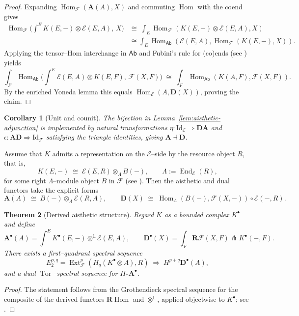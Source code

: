 \documentclass[12pt]{article}
\DeclareMathOperator{\Tor}{Tor}
\newcommand{\E}{\mathcal{E}}
\newcommand{\F}{\mathcal{F}}
\newcommand{\Ab}{\mathsf{Ab}}
\newcommand{\Hom}{\operatorname{Hom}}
\newcommand{\End}{\operatorname{End}}
\newcommand{\Ext}{\operatorname{Ext}}
\newcommand{\RHom}{\mathbf{R}\!\operatorname{Hom}}
\theoremstyle{plain}
\newtheorem{theorem}{Theorem}[section]
\newtheorem{corollary}[theorem]{Corollary}
\theoremstyle{definition}
\theoremstyle{remark}
\numberwithin{equation}{section}
\begin{document}
\begin{proof}
Expanding $\Hom_\F(\mathbf A(A),X)$ and commuting $\Hom$ with the coend gives
\begin{align*}
\Hom_\F\!\Big(\!\int^{E}K(E,-)\!\otimes\!\E(E,A),\,X\!\Big)
&\cong\;
\int_{E}\Hom_\F(K(E,-)\!\otimes\!\E(E,A),X)\\
&\cong
\int_{E}\Hom_\Ab(\E(E,A),\Hom_\F(K(E,-),X)).
\end{align*}
Applying the tensor–Hom interchange in $\Ab$ and Fubini's rule for (co)ends (see \cite{Kelly1982}) yields
\[
\int_{F}\Hom_\Ab\!\big(\!\int^{E}\E(E,A)\!\otimes\!K(E,F),\,\F(X,F)\big)
\;\cong\;\int_{F}\Hom_\Ab(K(A,F),\F(X,F)).
\]
By the enriched Yoneda lemma this equals $\Hom_\E(A,\mathbf D(X))$, proving the claim.
\end{proof}

\begin{corollary}[Unit and counit]\label{cor:unit-counit}
The bijection in Lemma~\ref{lem:aisthetic-adjunction} is implemented by natural transformations
$\eta:\mathrm{Id}_\E\!\Rightarrow\!\mathbf D\mathbf A$ and
$\epsilon:\mathbf A\mathbf D\!\Rightarrow\!\mathrm{Id}_\F$
satisfying the triangle identities, giving $\mathbf A\dashv\mathbf D$.
\end{corollary}

Assume that $K$ admits a representation on the $\E$–side by the resource object $R$, that is,
\begin{equation}\label{eq:RrepAest}
K(E,-)\;\cong\;\E(E,R)\otimes_\Lambda B(-),
\qquad
\Lambda:=\End_\E(R),
\end{equation}
for some right $\Lambda$–module object $B$ in $\F$ (see \cite{MacLane1998}).
Then the aisthetic and dual functors take the explicit forms
\[
\mathbf A(A)\;\cong\;B(-)\otimes_\Lambda \E(R,A),
\qquad
\mathbf D(X)\;\cong\;\Hom_\Lambda(B(-),\F(X,-))\circ\E(-,R).
\]

\begin{theorem}[Derived aisthetic structure]\label{thm:aisthetic-derived}
Regard $K$ as a bounded complex $K^\bullet$ and define
\[
\mathbf A^\bullet(A)=\int^{E}K^\bullet(E,-)\otimes^{\mathbb L}\E(E,A),
\qquad
\mathbf D^\bullet(X)=\int_{F}\mathbf R\!\F(X,F)\pitchfork K^\bullet(-,F).
\]
There exists a first–quadrant spectral sequence \cite{Weibel1994}
\[
E_2^{p,q}=\Ext^p_\F(H_q(K^\bullet\otimes A),R)\;\Longrightarrow\;H^{p+q}\mathbf D^\bullet(A),
\]
and a dual $\Tor$–spectral sequence for $H_\ast\mathbf A^\bullet$.
\end{theorem}

\begin{proof}
The statement follows from the Grothendieck spectral sequence for the composite of the derived functors $\RHom$ and $\otimes^{\mathbb L}$, applied objectwise to $K^\bullet$; see \cite{Weibel1994}.
\end{proof}
\end{document}
